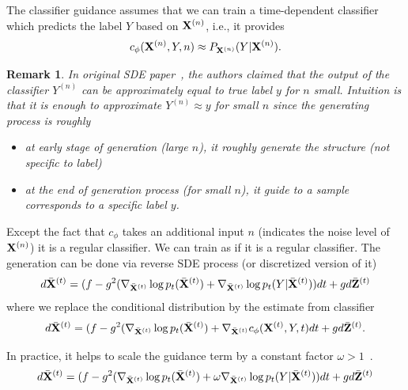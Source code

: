 \documentclass[11pt, a4paper]{article}
\newtheorem{remark}{Remark}
\begin{document}
The classifier guidance assumes that we can train a time-dependent classifier which predicts the label $Y$ based on ${\bf X}^{(n)}$, i.e., it provides
\begin{align}
    c_{\phi}({\bf X}^{(n)}, Y, n) \approx P_{{\bf X}^{(n)}}(Y|{\bf X}^{(n)}).
\end{align}

\begin{remark}
    In original SDE paper~\cite{song2021scorebased},
    the authors claimed that the output of the classifier $Y^{(n)}$ can be approximately equal to true label $y$ for $n$ small.
    Intuition is that it is enough to approximate $Y^{(n)}\approx y$ for small $n$ since the generating process is roughly
    \begin{itemize}
        \item at early stage of generation (large $n$), it roughly generate the structure (not specific to label)
        \item at the end of generation process (for small $n$), it guide to a sample corresponds to a specific label $y$.
    \end{itemize}
    
\end{remark}

Except the fact that $c_\phi$ takes an additional input $n$ (indicates the noise level of ${\bf X}^{(n)}$) it is a regular classifier.
We can train as if it is a regular classifier.
The generation can be done via reverse SDE process (or discretized version of it)
\begin{align}
    d\bar{{\bf X}}^{(t)} = (f - g^2 (\nabla_{\bar{{\bf X}}^{(t)}} \log p_t (\bar{{\bf X}}^{(t)}) + \nabla_{\bar{{\bf X}}^{(t)}} \log p_t (Y|\bar{{\bf X}}^{(t)}))dt + g d\bar{{\bf Z}}^{(t)}
\end{align}
where we replace the conditional distribution by the estimate from classifier
\begin{align}
    d\bar{{\bf X}}^{(t)} = (f - g^2 (\nabla_{\bar{{\bf X}}^{(t)}} \log p_t (\bar{{\bf X}}^{(t)}) + \nabla_{\bar{{\bf X}}^{(t)}} c_\phi ({\bf X}^{(t)}, Y, t) dt + g d\bar{{\bf Z}}^{(t)}.
\end{align}

In practice, it helps to scale the guidance term by a constant factor $\omega>1$~\cite{dhariwal2021diffusion}.
\begin{align}
    d\bar{{\bf X}}^{(t)} = (f - g^2 (\nabla_{\bar{{\bf X}}^{(t)}} \log p_t (\bar{{\bf X}}^{(t)}) 
    + \omega \nabla_{\bar{{\bf X}}^{(t)}} \log p_t (Y|\bar{{\bf X}}^{(t)}))dt + g d\bar{{\bf Z}}^{(t)}
\end{align}
\end{document}
